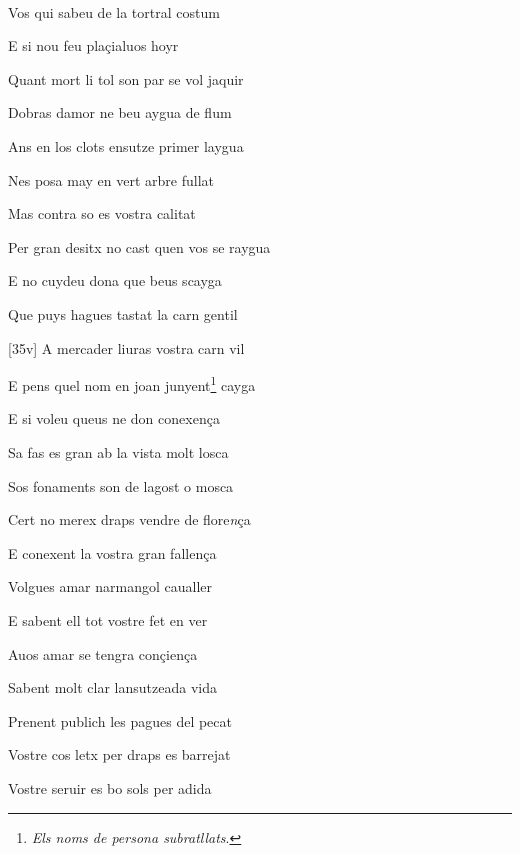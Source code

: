 \documentclass[12pt]{article}
\renewcommand{\espaiAbansEtiquetaPoema}{\vspace{0ex}}
\begin{document}
\begin{estrofa}

\espaiAbansEtiquetaPoema

\\

\end{estrofa}


\begin{estrofa}

 Vos qui sabeu de la tortral costum

 E si nou feu pla\c{c}ialuos hoyr

 Quant mort li tol son par se vol jaquir

 Dobras damor ne beu aygua de flum

 Ans en los clots ensutze primer laygua

 Nes posa may en vert arbre fullat

 Mas contra so es vostra calitat

 Per gran desitx no cast quen vos se raygua

\end{estrofa}



\begin{estrofa}

 E no cuydeu dona que beus scayga

 Que puys hagues tastat la carn gentil

 [35v] A mercader liuras vostra carn vil

 E pens quel nom en joan junyent\footnote{\textit{Els noms de persona
subratllats}.} cayga

 E si voleu queus ne don conexen\c{c}a

 Sa fas es gran ab la vista molt losca

 Sos fonaments son de lagost o mosca

 Cert no merex draps vendre de flore\textit{n}\c{c}a

\end{estrofa}



\begin{estrofa}

 E conexent la vostra gran fallen\c{c}a

 Volgues amar narmangol caualler

 E sabent ell tot vostre fet en ver

 Auos amar se tengra con\c{c}ien\c{c}a

 Sabent molt clar lansutzeada vida

 Prenent publich les pagues del pecat

 Vostre cos letx per draps es barrejat

 Vostre seruir es bo sols per adida

\end{estrofa}
\end{document}
